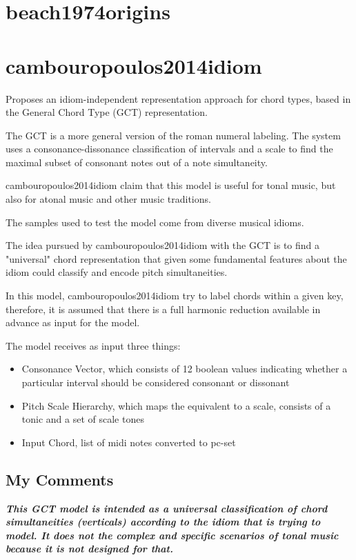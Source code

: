 \section{beach1974origins }
\section{cambouropoulos2014idiom }
  Proposes an idiom-independent representation approach for chord types, based in the General Chord Type (GCT) representation.

  The GCT is a more general version of the roman numeral labeling. The system uses a consonance-dissonance classification of intervals and a scale to find the maximal subset of consonant notes out of a note simultaneity.

  cambouropoulos2014idiom claim that this model is useful for tonal music, but also for atonal music and other music traditions.

  The samples used to test the model come from diverse musical idioms.

  The idea pursued by cambouropoulos2014idiom with the GCT is to find a "universal" chord representation that given some fundamental features about the idiom could classify and encode pitch simultaneities.

  In this model, cambouropoulos2014idiom try to label chords within a given key, therefore, it is assumed that there is a full harmonic reduction available in advance as input for the model.

  The model receives as input three things:
  \begin{itemize}
    \item Consonance Vector, which consists of 12 boolean values indicating whether a particular interval should be considered consonant or dissonant
    \item Pitch Scale Hierarchy, which maps the equivalent to a scale, consists of a tonic and a set of scale tones
    \item Input Chord, list of midi notes converted to pc-set
  \end{itemize}

  \subsection{My Comments}
    \emph{\textbf{
      This GCT model is intended as a universal classification of chord simultaneities (verticals) according to the idiom that is trying to model. It does not the complex and specific scenarios of tonal music because it is not designed for that.
    }}

